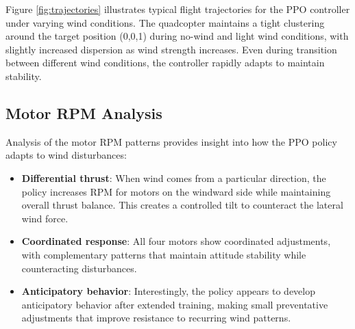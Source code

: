 \documentclass[12pt]{article}
\begin{document}

Figure \ref{fig:trajectories} illustrates typical flight trajectories for the PPO controller under varying wind conditions. The quadcopter maintains a tight clustering around the target position (0,0,1) during no-wind and light wind conditions, with slightly increased dispersion as wind strength increases. Even during transition between different wind conditions, the controller rapidly adapts to maintain stability.


\subsection{Motor RPM Analysis}

Analysis of the motor RPM patterns provides insight into how the PPO policy adapts to wind disturbances:


\begin{itemize}
    \item \textbf{Differential thrust}: When wind comes from a particular direction, the policy increases RPM for motors on the windward side while maintaining overall thrust balance. This creates a controlled tilt to counteract the lateral wind force.
    
    \item \textbf{Coordinated response}: All four motors show coordinated adjustments, with complementary patterns that maintain attitude stability while counteracting disturbances.
    
    \item \textbf{Anticipatory behavior}: Interestingly, the policy appears to develop anticipatory behavior after extended training, making small preventative adjustments that improve resistance to recurring wind patterns.
    
\end{itemize}
\end{document}
